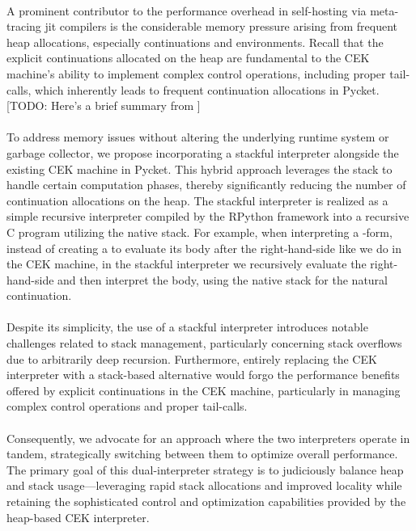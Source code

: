     \paragraph{}%
      A prominent contributor to the performance overhead in self-hosting via meta-tracing \gls{jit} compilers is the considerable memory pressure arising from frequent heap allocations, especially continuations and environments. Recall that the explicit continuations allocated on the heap are fundamental to the CEK machine's ability to implement complex control operations, including proper tail-calls, which inherently leads to frequent continuation allocations in Pycket. [TODO: Here's a brief summary from ]

    \paragraph{}%
      To address memory issues without altering the underlying runtime system or garbage collector, we propose incorporating a stackful interpreter alongside the existing CEK machine in Pycket. This hybrid approach leverages the stack to handle certain computation phases, thereby significantly reducing the number of continuation allocations on the heap. The stackful interpreter is realized as a simple recursive interpreter compiled by the RPython framework into a recursive C program utilizing the native stack. For example, when interpreting a -form, instead of creating a  to evaluate its body after the right-hand-side like we do in the CEK machine, in the stackful interpreter we recursively evaluate the right-hand-side and then interpret the body, using the native stack for the natural continuation.

    \paragraph{}%
      Despite its simplicity, the use of a stackful interpreter introduces notable challenges related to stack management, particularly concerning stack overflows due to arbitrarily deep recursion. Furthermore, entirely replacing the CEK interpreter with a stack-based alternative would forgo the performance benefits offered by explicit continuations in the CEK machine, particularly in managing complex control operations and proper tail-calls.

    \paragraph{}%
      Consequently, we advocate for an approach where the two interpreters operate in tandem, strategically switching between them to optimize overall performance. The primary goal of this dual-interpreter strategy is to judiciously balance heap and stack usage—leveraging rapid stack allocations and improved locality while retaining the sophisticated control and optimization capabilities provided by the heap-based CEK interpreter.

